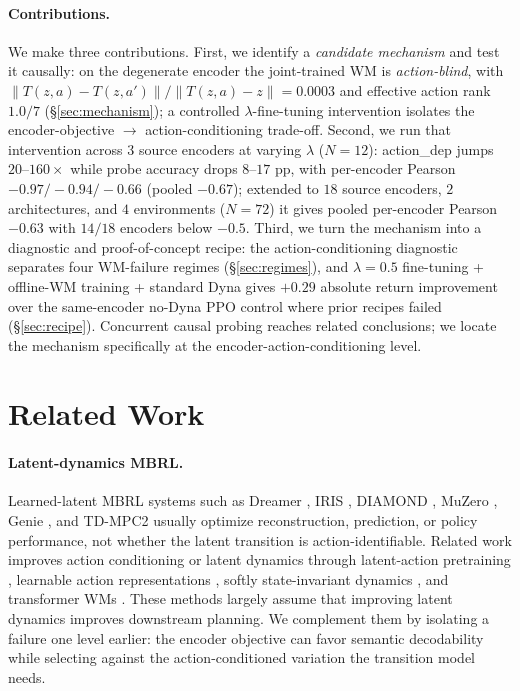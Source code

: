 \documentclass{article}
\begin{document}
\paragraph{Contributions.} We make three contributions. First, we identify a \emph{candidate mechanism} and test it causally: on the degenerate encoder the joint-trained WM is \emph{action-blind}, with $\|T(z, a) - T(z, a')\| / \|T(z, a) - z\| = 0.0003$ and effective action rank $1.0/7$ (\S\ref{sec:mechanism}); a controlled $\lambda$-fine-tuning intervention isolates the encoder-objective $\to$ action-conditioning trade-off. Second, we run that intervention across $3$ source encoders at varying $\lambda$ ($N{=}12$): action\_dep jumps $20$--$160\times$ while probe accuracy drops $8$--$17$ pp, with per-encoder Pearson $-0.97 / -0.94 / -0.66$ (pooled $-0.67$); extended to $18$ source encoders, $2$ architectures, and $4$ environments ($N{=}72$) it gives pooled per-encoder Pearson $-0.63$ with $14/18$ encoders below $-0.5$. Third, we turn the mechanism into a diagnostic and proof-of-concept recipe: the action-conditioning diagnostic separates four WM-failure regimes (\S\ref{sec:regimes}), and $\lambda{=}0.5$ fine-tuning + offline-WM training + standard Dyna gives $\mathbf{+0.29}$ absolute return improvement over the same-encoder no-Dyna PPO control where prior recipes failed (\S\ref{sec:recipe}). Concurrent causal probing \citep{zhang2026whatworldmodelslearn} reaches related conclusions; we locate the mechanism specifically at the encoder-action-conditioning level.

\section{Related Work}

\paragraph{Latent-dynamics MBRL.} Learned-latent MBRL systems such as Dreamer \citep{hafner2019dream,hafner2023diverse}, IRIS \citep{micheli2023iris}, DIAMOND \citep{alonso2024diamond}, MuZero \citep{schrittwieser2020muzero}, Genie \citep{bruce2024genie}, and TD-MPC2 \citep{hansen2024tdmpc2} usually optimize reconstruction, prediction, or policy performance, not whether the latent transition is action-identifiable. Related work improves action conditioning or latent dynamics through latent-action pretraining \citep{gao2025adaworld}, learnable action representations \citep{zhang2024prelar}, softly state-invariant dynamics \citep{saanum2024plsm}, and transformer WMs \citep{burchi2025twister,dedieu2025improving}. These methods largely assume that improving latent dynamics improves downstream planning. We complement them by isolating a failure one level earlier: the encoder objective can favor semantic decodability while selecting against the action-conditioned variation the transition model needs.
\end{document}
